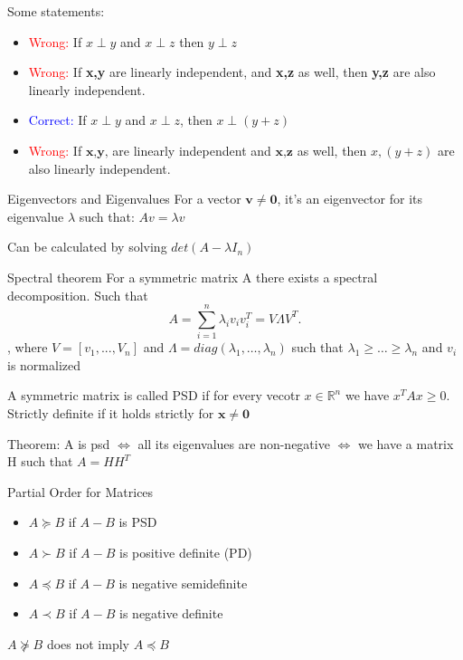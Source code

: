 \documentclass[a4paper]{article}
\begin{document}
Some statements:
\begin{itemize}
    \item \textcolor{red}{Wrong:} If $x\perp y$ and $x \perp z$ then $y \perp z$    
    \item \textcolor{red}{Wrong:} If \textbf{x,y}  are linearly independent, and \textbf{x,z}  as well, then \textbf{y,z}  are also linearly independent. 
    \item \textcolor{blue}{Correct:} If $x\perp y$ and $x\perp z$, then $x \perp (y+z)$ 
    \item \textcolor{red}{Wrong:} If $\textbf{x,y,}$ are linearly independent and $\textbf{x,z}$ as well, then $x, (y+z)$ are also linearly independent.
\end{itemize}



\begin{subbox}{Eigenvectors and Eigenvalues}
    For a vector $\mathbf{v} \neq \mathbf{0}$, it's an eigenvector for its eigenvalue $\lambda$ such that: $Av = \lambda v$    
    
\end{subbox}
Can be calculated by solving $det(A - \lambda I_n)$  

\begin{mainbox}{Spectral theorem}
    For a symmetric matrix A there exists a spectral decomposition. Such that \[
    A = \sum_{i=1}^{n} \lambda_i v_i v_i^T = V \Lambda V^T
    .\],
    where $ V= [v_1, ..., V_n]$ and $\Lambda = diag(\lambda_1, \dots, \lambda_n)$ such that $\lambda_1 \geq \dots \geq \lambda_n$ and $v_i$ is normalized 
\end{mainbox}

A symmetric matrix is called PSD if for every vecotr $x\in\mathbb{R}^n$ we have $x^TAx \geq 0$. Strictly definite if it holds strictly for $\mathbf{x} \neq \mathbf{0}$   

Theorem:
A is psd $\Leftrightarrow $ all its eigenvalues are non-negative $\Leftrightarrow$ we have a matrix H such that $A=HH^T$  

\begin{subbox}{Partial Order for Matrices}
    \begin{itemize}
        \item $A \succeq B$ if $A-B$ is PSD
        \item $A\succ B$ if $A-B$ is positive definite (PD)
        \item $A\preceq B$ if $A-B$ is negative semidefinite
        \item $A \prec B$ if $A-B$ is negative definite      
    \end{itemize}
    $A\nsucceq  B$ does not imply $A \preceq B$ 
    
\end{subbox}
\end{document}
